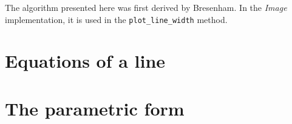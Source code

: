 \documentclass[12pt,a4,oneside,usenames,dvipsnames]{book}
\begin{document}
The algorithm presented here was first derived by Bresenham. In the \emph{Image} implementation, it is used in the \texttt{plot\_line\_width} method.


\chapter{Equations of a line}
\chapter{The parametric form}
\end{document}
